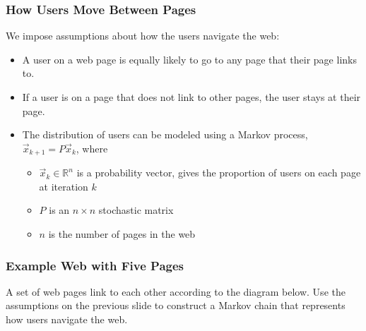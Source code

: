 \begin{frame}\frametitle{How Users Move Between Pages}
    We impose assumptions about how the users navigate the web: 
    \begin{itemize}\setlength{\itemsep}{4pt}
    	\item<2->[a)] A user on a web page is equally likely to go to any page that their page links to. 
	    \item<3->[b)] If a user is on a page that does not link to other pages, the user stays at their page.
	    \item<4->[c)] The distribution of users can be modeled using a Markov process, $\vec x_{k+1} = P \vec x_k$, where 

	    \begin{itemize}\setlength{\itemsep}{4pt}
	        \item $\vec x_k \in \mathbb R^n$ is a probability vector, gives the proportion of users on each page at iteration $k$
	        \item $P$ is an $n\times n$ stochastic matrix
    	    \item $n$ is the number of pages in the web
	    \end{itemize}
	\end{itemize}
	

\end{frame}



\begin{frame}\frametitle{Example Web with Five Pages}
    A set of web pages link to each other according to the diagram below. Use the assumptions on the previous slide to construct a Markov chain that represents how users navigate the web.
    
    \pause 
    
    \begin{center}
    \end{center}    
    
    
    
\end{frame}



